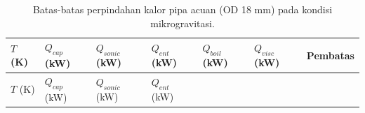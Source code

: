 \documentclass[
  indonesian,
  12pt,
  a4paper,
]{report}
\begin{document}
\begin{longtable}[]{@{}
  >{\centering\arraybackslash}p{}
  >{\centering\arraybackslash}p{}
  >{\centering\arraybackslash}p{}
  >{\centering\arraybackslash}p{}
  >{\centering\arraybackslash}p{}
  >{\centering\arraybackslash}p{}
  >{\centering\arraybackslash}p{}@{}}
\caption{Batas-batas perpindahan kalor pipa acuan (OD 18 mm) pada
kondisi mikrogravitasi.}\label{tbl-amplop}\tabularnewline
\toprule\noalign{}
\begin{minipage}[b]{\linewidth}\centering
\(T\) (K)
\end{minipage} & \begin{minipage}[b]{\linewidth}\centering
\(Q_{cap}\) (kW)
\end{minipage} & \begin{minipage}[b]{\linewidth}\centering
\(Q_{sonic}\) (kW)
\end{minipage} & \begin{minipage}[b]{\linewidth}\centering
\(Q_{ent}\) (kW)
\end{minipage} & \begin{minipage}[b]{\linewidth}\centering
\(Q_{boil}\) (kW)
\end{minipage} & \begin{minipage}[b]{\linewidth}\centering
\(Q_{visc}\) (kW)
\end{minipage} & \begin{minipage}[b]{\linewidth}\centering
Pembatas
\end{minipage} \\
\midrule\noalign{}
\endfirsthead
\toprule\noalign{}
\begin{minipage}[b]{\linewidth}\centering
\(T\) (K)
\end{minipage} & \begin{minipage}[b]{\linewidth}\centering
\(Q_{cap}\) (kW)
\end{minipage} & \begin{minipage}[b]{\linewidth}\centering
\(Q_{sonic}\) (kW)
\end{minipage} & \begin{minipage}[b]{\linewidth}\centering
\(Q_{ent}\) (kW)
\end{minipage} & \begin{minipage}[b]{\linewidth}\centering

\end{minipage}
\end{longtable}
\end{document}
